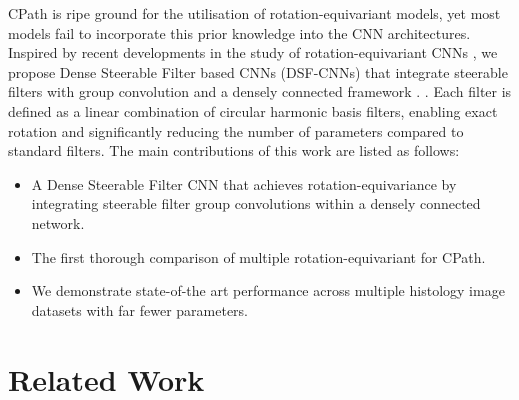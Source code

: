 \documentclass[journal]{IEEEtran}
\newcommand\mg[1]{{\color{black}{#1}}}
\begin{document}
CPath is ripe ground for the utilisation of rotation-equivariant models, yet most models fail to incorporate this prior knowledge into the CNN architectures. Inspired by recent developments in the study of rotation-equivariant CNNs \cite{cohen2016group,weiler2018learning,marcos2017rotation,lafarge2020roto}, we propose Dense Steerable Filter based CNNs (DSF-CNNs) that integrate steerable filters \cite{freeman1991design} with group convolution \cite{cohen2016group} and a densely connected framework \cite{densenet}. \mg{Dense connectivity enables efficient gradient propagation, encourages feature re-use and consequently leads to superior performance}. Each filter is defined as a linear combination of circular harmonic basis filters, enabling exact rotation and significantly reducing the number of parameters compared to standard filters. The main contributions of this work are listed as follows:  

	\begin{itemize}
	    \item A Dense Steerable Filter CNN that achieves rotation-equivariance by integrating steerable filter group convolutions within a densely connected network.
	    \item The first thorough comparison of multiple rotation-equivariant for CPath. 
	\item We demonstrate state-of-the art performance across multiple histology image datasets with far fewer parameters. 
	\end{itemize}

\section{Related Work}
\end{document}
